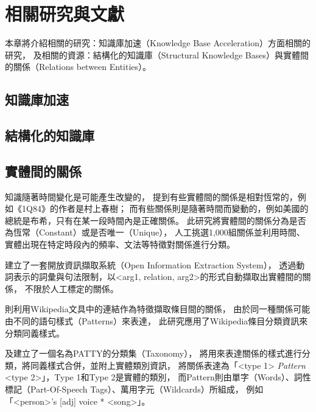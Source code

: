 %
%
%
\chapter{相關研究與文獻}
\label{c:related}

本章將介紹相關的研究：知識庫加速（Knowledge Base Acceleration）方面相關的研究，
及相關的資源：結構化的知識庫（Structural Knowledge Bases）與實體間的關係（Relations between Entities）。

%
%
\section{知識庫加速}

\cite{kba2012}
\cite{kba2013}

\cite{kba-hltoce}
\cite{kba-msra}

\cite{kba-entity-detection}

%
%
\section{結構化的知識庫}

\cite{freebase}
\cite{dbpedia}
\cite{yago}


%
%
\section{實體間的關係}

知識隨著時間變化是可能產生改變的，
\cite{relationsByTime} 提到有些實體間的關係是相對恆常的，例如《1Q84》的作者是村上春樹；
而有些關係則是隨著時間而變動的，例如美國的總統是布希，只有在某一段時間內是正確關係。
此研究將實體間的關係分為是否為恆常（Constant）或是否唯一（Unique），
人工挑選1,000組關係並利用時間、實體出現在特定時段內的頻率、文法等特徵對關係進行分類。

\cite{reverb} 建立了一套開放資訊擷取系統（Open Information Extraction System），
透過動詞表示的詞彙與句法限制，以<arg1, relation, arg2>的形式自動擷取出實體間的關係，
不限於人工標定的關係。

\cite{wisenet} 則利用Wikipedia文具中的連結作為特徵擷取條目間的關係，
由於同一種關係可能由不同的語句樣式（Patterns）來表達，
此研究應用了Wikipedia條目分類資訊來分類同義樣式。

\cite{patty2012}及\cite{patty}建立了一個名為PATTY的分類集（Taxonomy），
將用來表達關係的樣式進行分類，將同義樣式合併，並附上實體類別資訊，
將關係表達為「<type 1> \emph{Pattern} <type 2>」，Type 1和Type 2是實體的類別，
而Pattern則由單字（Words）、詞性標記（Part-Of-Speech Tags）、萬用字元（Wildcards）所組成，
例如「<person>'s [adj] voice * <song>」。   %

